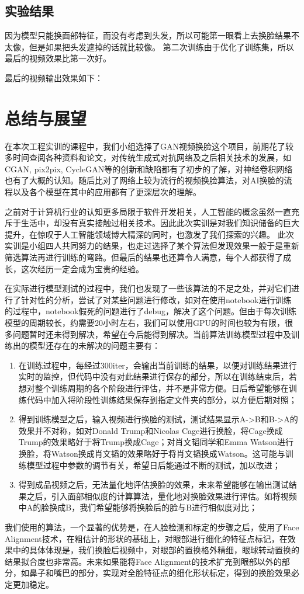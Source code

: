 \section{实验结果}
因为模型只能换面部特征，而没有考虑到头发，所以可能第一眼看上去换脸结果不太像，但是如果把头发遮掉的话就比较像。
第二次训练由于优化了训练集，所以最后的视频效果比第一次好。

最后的视频输出效果如下：


\chapter{总结与展望}
\label{conclusions}  
在本次工程实训的课程中，我们小组选择了GAN视频换脸这个项目，前期花了较多时间查阅各种资料和论文，对传统生成式对抗网络及之后相关技术的发展，如CGAN, pix2pix, CycleGAN等的创新和缺陷都有了初步的了解，对神经卷积网络也有了大概的认知。随后比对了网络上较为流行的视频换脸算法，对AI换脸的流程以及各个模型在其中的应用都有了更深层次的理解。

之前对于计算机行业的认知更多局限于软件开发相关，人工智能的概念虽然一直充斥于生活中，却没有真实接触过相关技术。因此此次实训是对我们知识储备的巨大提升，在惊叹于人工智能领域博大精深的同时，也激发了我们探索的兴趣。
此次实训是小组四人共同努力的结果，也走过选择了某个算法但发现效果一般于是重新筛选算法再进行训练的弯路。但最后的结果也还算令人满意，每个人都获得了成长，这次经历一定会成为宝贵的经验。

在实际进行模型测试的过程中，我们也发现了一些该算法的不足之处，并对它们进行了针对性的分析，尝试了对某些问题进行修改，如对在使用notebook进行训练的过程中，notebook假死的问题进行了debug，解决了这个问题。但由于每次训练模型的周期较长，约需要20小时左右，我们可以使用GPU的时间也较为有限，很多问题暂时还未得到解决，希望在今后能得到解决。当前算法训练模型过程中及训练出的模型还存在的未解决的问题主要有：
\begin{enumerate}
	\item 在训练过程中，每经过300iter，会输出当前训练的结果，以便对训练结果进行实时的监控，但代码中没有对此结果进行保存的部分，所以在训练结束后，若想对整个训练周期的各个阶段进行评估，并不是非常方便。日后希望能够在训练代码中加入将阶段性训练结果保存到指定文件夹的部分，以方便后期对照；
	\item 得到训练模型之后，输入视频进行换脸的测试，测试结果显示A->B和B->A的效果并不对称，如对Donald Trump和Nicolas Cage进行换脸，将Cage换成Trump的效果略好于将Trump换成Cage；对肖文韬同学和Emma Watson进行换脸，将Watson换成肖文韬的效果略好于将肖文韬换成Watson。这可能与训练模型过程中参数的调节有关，希望日后能通过不断的测试，加以改进；
	\item  得到成品视频之后，无法量化地评估换脸的效果，未来希望能够在输出测试结果之后，引入面部相似度的计算算法，量化地对换脸效果进行评估。如将视频中A的脸换成B，我们希望能够将换脸后的脸与B进行相似度对比；
\end{enumerate}

我们使用的算法，一个显著的优势是，在人脸检测和标定的步骤之后，使用了Face Alignment技术，在粗估计的形状的基础上，对眼部进行细化的特征点标记，在效果中的具体体现是，我们换脸后视频中，对眼部的置换格外精细，眼球转动置换的结果拟合度也非常高。未来如果能将Face Alignment的技术扩充到眼部以外的部分，如鼻子和嘴巴的部分，实现对全脸特征点的细化形状标定，得到的换脸效果必定更加稳定。

